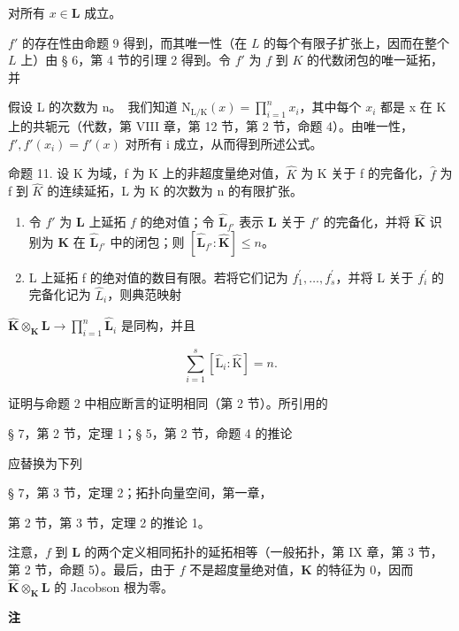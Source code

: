 对所有 \(x \in \mathbf{L}\) 成立。

\(f'\) 的存在性由命题 9 得到，而其唯一性（在 \(L\) 的每个有限子扩张上，因而在整个 \(L\) 上）由 § 6，第 4 节的引理 2 得到。令 \(f'\) 为 \(f\) 到 \(K\) 的代数闭包的唯一延拓，并

假设 L 的次数为 n。~我们知道 \(\mathrm{N}_{\mathrm{L}/\mathrm{K}}(x)=\prod_{i=1}^{n} x_i\)，其中每个 \(x_{i}\) 都是 x 在 K 上的共轭元（代数，第 VIII 章，第 12 节，第 2 节，命题 4）。由唯一性，\(f', f'(x_{i})=f'(x)\) 对所有 i 成立，从而得到所述公式。

命题 11. 设 K 为域，f 为 K 上的非超度量绝对值，\(\hat{K}\) 为 K 关于 f 的完备化，\(\hat{f}\) 为 f 到 \(\hat{K}\) 的连续延拓，L 为 K 的次数为 n 的有限扩张。

\begin{enumerate}
\def\labelenumi{(\alph{enumi})}
\item
  令 \(f'\) 为 \(\mathbf{L}\) 上延拓 \(f\) 的绝对值；令 \(\hat{\mathbf{L}}_{f'}\) 表示 \(\mathbf{L}\) 关于 \(f'\) 的完备化，并将 \(\hat{\mathbf{K}}\) 识别为 \(\mathbf{K}\) 在 \(\hat{\mathbf{L}}_{f'}\) 中的闭包；则 \([\hat{\mathbf{L}}_{f'}: \hat{\mathbf{K}}] \leqslant n\)。
\item
  L 上延拓 f 的绝对值的数目有限。若将它们记为 \(f_{1}^{\prime}, \ldots, f_{s}^{\prime}\)，并将 L 关于 \(f_{i}^{\prime}\) 的完备化记为 \(\hat{L}_{i}\)，则典范映射
\end{enumerate}

\(\hat{\mathbf{K}}\otimes_{\mathbf{K}}\mathbf{L}\rightarrow \prod_{i = 1}^{n}\hat{\mathbf{L}}_i\) 是同构，并且

\[
\sum_ {i = 1} ^ {s} \left[ \hat {\mathrm{L}} _ {i}: \hat {\mathrm{K}} \right] = n.\tag{10}
\]

证明与命题 2 中相应断言的证明相同（第 2 节）。所引用的

§ 7，第 2 节，定理 1；§ 5，第 2 节，命题 4 的推论

应替换为下列

§ 7，第 3 节，定理 2；拓扑向量空间，第一章，

第 2 节，第 3 节，定理 2 的推论 1。

注意，\(f\) 到 \(\mathbf{L}\) 的两个定义相同拓扑的延拓相等（一般拓扑，第 IX 章，第 3 节，第 2 节，命题 5）。最后，由于 \(f\) 不是超度量绝对值，\(\mathbf{K}\) 的特征为 0，因而 \(\hat{\mathbf{K}} \otimes_{\mathbf{K}} \mathbf{L}\) 的 Jacobson 根为零。

\textbf{注}\par

